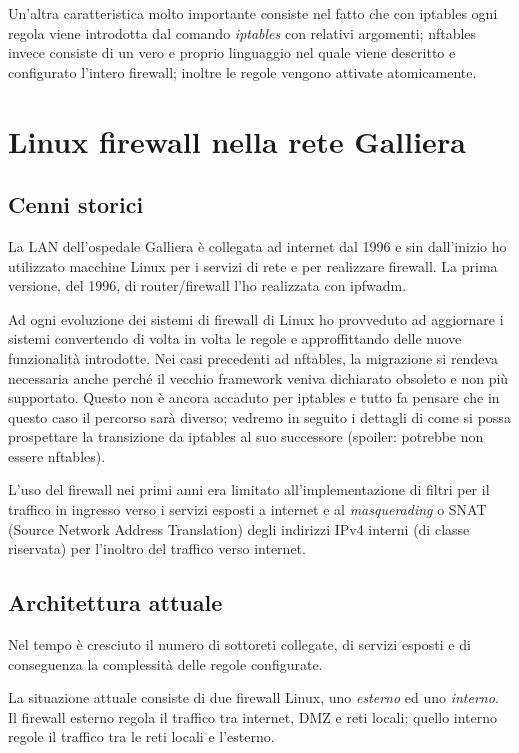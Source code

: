 Un'altra caratteristica molto importante consiste nel fatto che con iptables
ogni regola viene introdotta dal comando {\em iptables} con relativi
argomenti; nftables invece consiste di un vero e proprio linguaggio nel quale
viene descritto e configurato l'intero firewall; inoltre le regole vengono
attivate atomicamente.

\chapter{Linux firewall nella rete Galliera}
\section{Cenni storici}

La LAN dell'ospedale Galliera è collegata ad internet dal 1996 e sin
dall'inizio ho utilizzato macchine Linux per i servizi di rete e per
realizzare firewall.  La prima versione, del 1996, di router/firewall l'ho
realizzata con ipfwadm.

Ad ogni evoluzione dei sistemi di firewall di Linux ho provveduto ad
aggiornare i sistemi convertendo di volta in volta le regole e approffittando
delle nuove funzionalità introdotte.  Nei casi precedenti ad nftables, la
migrazione si rendeva necessaria anche perché il vecchio framework veniva
dichiarato obsoleto e non più supportato.  Questo non è ancora accaduto per
iptables e tutto fa pensare che in questo caso il percorso sarà diverso;
vedremo in seguito i dettagli di come si possa prospettare la transizione da
iptables al suo successore (spoiler: potrebbe non essere nftables).

L'uso del firewall nei primi anni era limitato all'implementazione di filtri
per il traffico in ingresso verso i servizi esposti a internet e al {\em
masquerading} o SNAT (Source Network Address Translation) degli indirizzi IPv4
interni (di classe riservata) per l'inoltro del traffico verso internet.

\section{Architettura attuale}

Nel tempo è cresciuto il numero di sottoreti collegate, di servizi esposti e
di conseguenza la complessità delle regole configurate.

La situazione attuale consiste di due firewall Linux, uno {\em esterno} ed uno
{\em interno}.  Il firewall esterno regola il traffico tra internet, DMZ e
reti locali; quello interno regole il traffico tra le reti locali e l'esterno.

